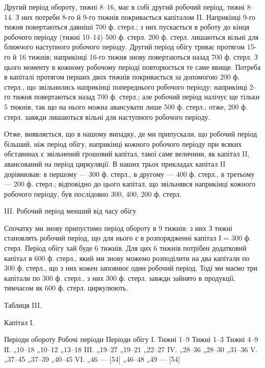 Другий період обороту, тижні 8--16, має в собі другий робочий
період, тижні 8--14. З них потреби 8-го й 9-го тижнів покривається
капіталом II. Наприкінці 9-го тижня повертаються давніші 700 ф. стерл.;
з них пускається в роботу до кінця робочого періоду (тижні 10--14)
500 ф. стерл. 200 ф. стерл. лишаються вільні для ближчого наступного
робочого періоду. Другий період обігу триває протягом 15-го й 16 тижнів;
наприкінці 16-го тижня знову повертаються назад 700 ф. стерл.
З цього моменту в кожному робочому періоді повторюється те саме
явище. Потреба в капіталі протягом перших двох тижнів покривається
за допомогою 200 ф. стерл., що звільнились наприкінці попереднього
робочого періоду; наприкінці 2-го тижня повертаються назад 700 ф.
стерл.; але робочий період налічує ще тільки 5 тижнів, так що на нього
можна авансувати лише 500 ф. стерл.; отже, 200 ф. стерл. завжди лишаються
вільні для наступного робочого періоду.

Отже, виявляється, що в нашому випадку, де ми припускали, що робочий
період більший, ніж період обігу, наприкінці кожного робочого
періоду при всяких обставинах є звільнений грошовий капітал, такої
саме величини, як капітал II, авансований на період циркуляції. В наших
трьох прикладах капітал II дорівнював: в першому — 300 ф. стерл., в
другому — 400 ф. стерл., в третьому — 200 ф. стерл.; відповідно до
цього капітал, що звільнявся наприкінці кожного робочого періоду, був
послідовно 300, 400, 200 ф. стерл.

III. Робочий період менший від часу обігу

Спочатку ми знову припустимо період обороту в 9 тижнів: з них
З тижні становлять робочий період, що для нього є в розпорядженні
капітал І = 300 ф. стерл. Період обігу хай буде 6 тижнів. Для цих
6 тижнів потрібен додатковий капітал в 600 ф. стерл., який ми знову
можемо розподілити на два капітали по 300 ф. стерл., що з них кожен
заповнює один робочий період. Тоді ми маємо три капітали по 300 ф.
стерл., з них 300 ф. стерл. завжди зайнято в продукції, тимчасом як
600 ф. стерл. циркулюють.

Таблиця III.

Капітал І.

Періоди обороту    Робочі періоди    Періоди обігу
І. Тижні 1--9    Тижні 1--3    Тижні 4--9
ІІ. „10--18 „10--12 „13--18
III. „19--27 „19--21 „22--27
IV. „28--36 „28--30 „31--36
V. „37--45 „37--39 „40--45
VI. „46 — [54] „46--48 „49 — [54]
